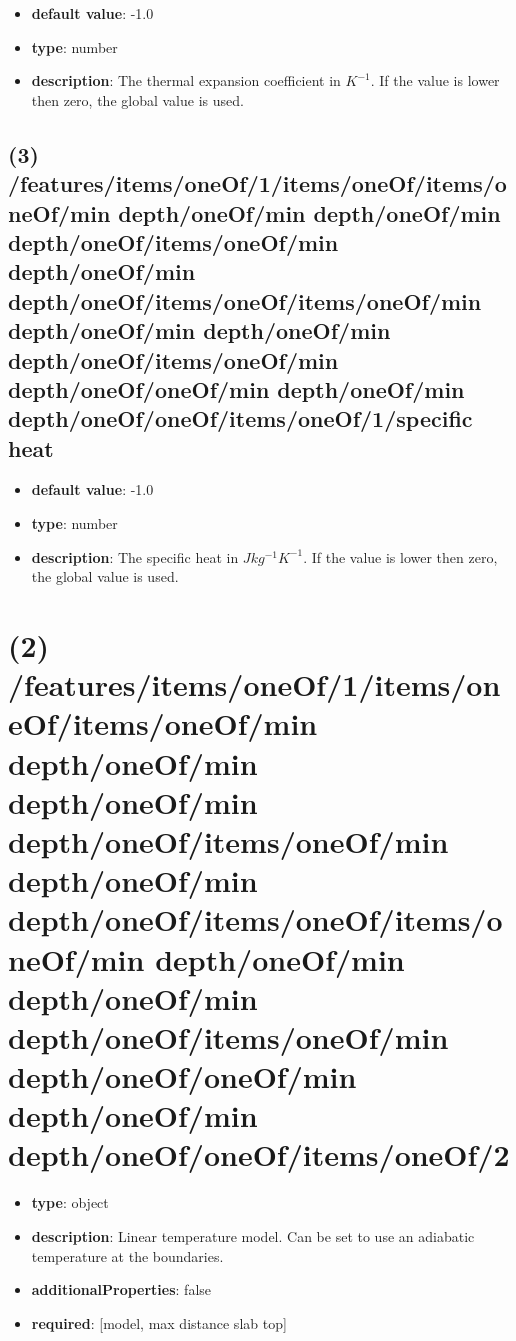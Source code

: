 \begin{itemize}[leftmargin=3em]\item {\bf default value}: -1.0
\item {\bf type}: number
\item {\bf description}: The thermal expansion coefficient in $K^{-1}$. If the value is lower then zero, the global value is used.
\end{itemize}\subsection{(3) /features/items/oneOf/1/items/oneOf/items/oneOf/min depth/oneOf/min depth/oneOf/min depth/oneOf/items/oneOf/min depth/oneOf/min depth/oneOf/items/oneOf/items/oneOf/min depth/oneOf/min depth/oneOf/min depth/oneOf/items/oneOf/min depth/oneOf/oneOf/min depth/oneOf/min depth/oneOf/oneOf/items/oneOf/1/specific heat}
\begin{itemize}[leftmargin=3em]\item {\bf default value}: -1.0
\item {\bf type}: number
\item {\bf description}: The specific heat in $J kg^{-1} K^{-1}$. If the value is lower then zero, the global value is used.
\end{itemize}\section{(2) /features/items/oneOf/1/items/oneOf/items/oneOf/min depth/oneOf/min depth/oneOf/min depth/oneOf/items/oneOf/min depth/oneOf/min depth/oneOf/items/oneOf/items/oneOf/min depth/oneOf/min depth/oneOf/min depth/oneOf/items/oneOf/min depth/oneOf/oneOf/min depth/oneOf/min depth/oneOf/oneOf/items/oneOf/2}
\begin{itemize}[leftmargin=2em]\item {\bf type}: object
\item {\bf description}: Linear temperature model. Can be set to use an adiabatic temperature at the boundaries.
\item {\bf additionalProperties}: false
\item {\bf required}: [model, max distance slab top]\end{itemize}
